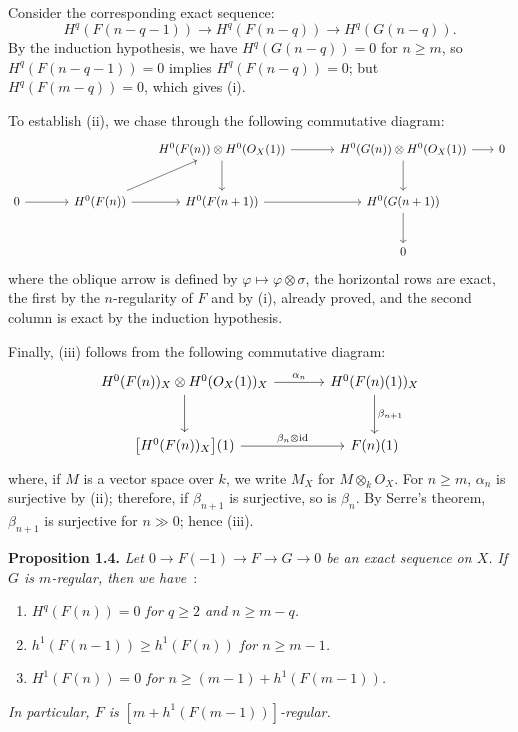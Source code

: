 Consider the corresponding exact sequence:
\[
H^q(F(n-q-1))\longrightarrow H^q(F(n-q))\longrightarrow H^q(G(n-q)).
\]
By the induction hypothesis, we have \(H^q(G(n-q))=0\) for \(n\ge m\), so \(H^q(F(n-q-1))=0\) implies \(H^q(F(n-q))=0\); but \(H^q(F(m-q))=0\), which gives (i).

To establish (ii), we chase through the following commutative diagram:
\[
\begin{tikzcd}[column sep=1.8em,row sep=2.5em]
 & & & H^0(F(n))\otimes H^0({O}_X(1)) \arrow[rr] \arrow[d]
 & & H^0(G(n))\otimes H^0({O}_X(1)) \arrow[r] \arrow[d]
 & 0 \\
0 \arrow[rr]
& & H^0(F(n)) \arrow[ur] \arrow[r]
& H^0(F(n+1)) \arrow[rr]
& & H^0(G(n+1)) \arrow[d] \\
& & & & & 0
\end{tikzcd}
\]
where the oblique arrow is defined by \(\varphi\mapsto\varphi\otimes\sigma\), the horizontal rows are exact, the first by the \(n\)-regularity of \(F\) and by (i), already proved, and the second column is exact by the induction hypothesis.

Finally, (iii) follows from the following commutative diagram:
\[
\begin{tikzcd}[column sep=large,row sep=large]
H^0(F(n))_X\otimes H^0({O}_X(1))_X
  \arrow[r,"\alpha_n"]
  \arrow[d]
& H^0(F(n)(1))_X
  \arrow[d,"\beta_{n+1}"] \\
\bigl[H^0(F(n))_X\bigr](1)
  \arrow[r,"\beta_n\otimes\mathrm{id}"]
& F(n)(1)
\end{tikzcd}
\]
%
where, if \(M\) is a vector space over \(k\), we write \(M_X\) for \(M\otimes_k{O}_X\). For \(n\ge m\), \(\alpha_n\) is surjective by (ii); therefore, if \(\beta_{n+1}\) is surjective, so is \(\beta_n\). By Serre's theorem, \(\beta_{n+1}\) is surjective for \(n\gg0\); hence (iii).

\textbf{Proposition 1.4.} \emph{Let \(0\to F(-1)\to F\to G\to0\) be an exact sequence on \(X\). If \(G\) is \(m\)-regular, then we have}~:
\begin{enumerate}[label=(\roman*)]
\item \emph{\(H^q(F(n))=0\) for \(q\ge2\) and \(n\ge m-q\).}
\item \emph{\(h^1(F(n-1))\ge h^1(F(n))\) for \(n\ge m-1\).}
\item \emph{\(H^1(F(n))=0\) for \(n\ge (m-1)+h^1(F(m-1))\).}
\end{enumerate}
\emph{In particular, \(F\) is \([m+h^1(F(m-1))]\)-regular.}

